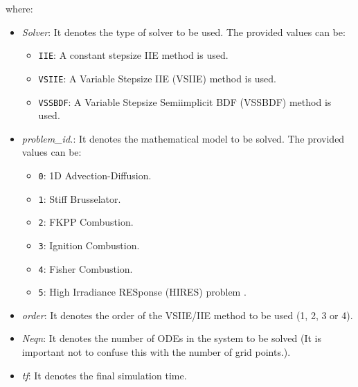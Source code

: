 \documentclass[preprint,1p]{article}
\begin{document}
\vspace{0.3cm}
\vspace{0.3cm}

\noindent where:

\begin{itemize}

    \item {\em Solver}: It denotes the type of solver to be used. 
        The provided values can be:
	    \begin{itemize}
			\item {\tt IIE}: A constant stepsize IIE method is used.
            \item {\tt VSIIE}: A Variable Stepsize IIE (VSIIE) method is used.
            \item {\tt VSSBDF}: A Variable Stepsize Semiimplicit BDF (VSSBDF) method is used.
	    \end{itemize} 

	\item {\em problem\_id.}: It denotes the mathematical model to be solved. The provided values can be:
	    \begin{itemize}
		    \item {\tt 0}: 1D Advection-Diffusion.	
		    \item {\tt 1}: Stiff Brusselator.
		    \item {\tt 2}: FKPP Combustion.		
		    \item {\tt 3}: Ignition Combustion.
		    \item {\tt 4}: Fisher Combustion.
		    \item {\tt 5}: High Irradiance RESponse (HIRES) problem \cite{HIRES}.
		\end{itemize}

    \item {\em order}: It denotes the order of the VSIIE/IIE method to be used (1, 2, 3  or 4).

	\item {\em Neqn}: It denotes the number of ODEs in the system to be solved 
	(It is important not to confuse this with the number of grid points.).
	
	\item {\em tf}: It denotes the final simulation time. 


\end{itemize}
\end{document}
